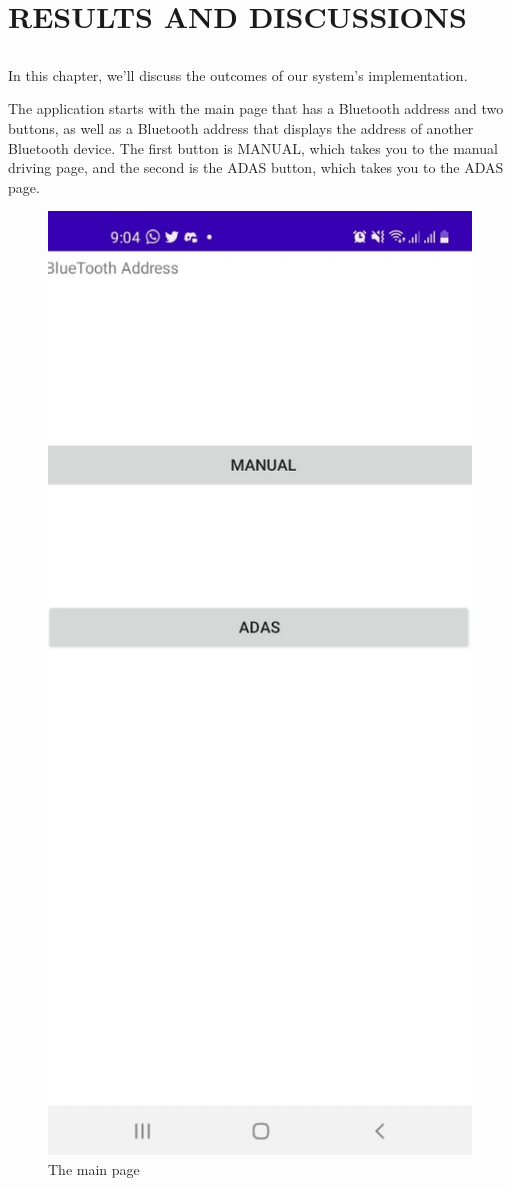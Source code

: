 \documentclass[12pt,a4paper]{report}
\begin{document}
\chapter{RESULTS AND DISCUSSIONS}
\section{\fontsize{12}{12}\selectfont{Results}}
In this chapter, we'll discuss the outcomes of our system's implementation.

The application starts with the main page that has a Bluetooth address and two buttons, as well as a Bluetooth address that displays the address of another Bluetooth device. The first button is MANUAL, which takes you to the manual driving page, and the second is the ADAS button, which takes you to the ADAS page.
\begin{figure}[H]
    \centering
    \graphicspath{ {./images/} }
    \includegraphics[width=.5\textwidth,height=.5\textheight ]{main.jpg}
    \caption{The main page}
    \label{fig:mesh1}
\end{figure}
\end{document}
